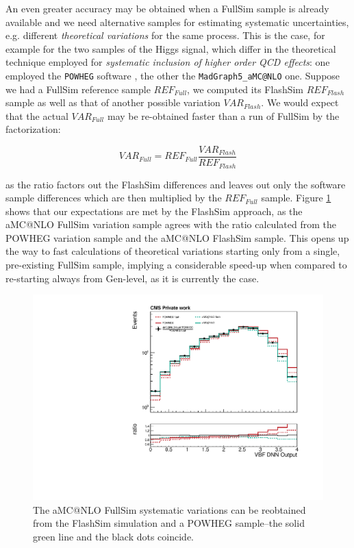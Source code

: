 An even greater accuracy may be obtained when a FullSim sample is already available and we need alternative samples for estimating systematic uncertainties, e.g.  different \emph{theoretical variations} for the same process. This is the case, for example for the two samples of the Higgs signal, which differ in the theoretical technique employed for \emph{systematic inclusion of higher order QCD effects}: one employed the \texttt{POWHEG} software \cite{Nason_2004}, the other the \texttt{MadGraph5\_aMC@NLO} \cite{powpow} one. Suppose we had a FullSim reference sample $REF_{Full}$, we computed its FlashSim $REF_{Flash}$ sample as well as that of another possible variation $VAR_{Flash}$. We would expect that the actual $VAR_{Full}$ may be re-obtained faster than a run of FullSim by the factorization:

\[VAR_{Full} = REF_{Full} \frac{VAR_{Flash}}{REF_{Flash}}
\]

as the ratio factors out the FlashSim differences and leaves out only the software sample differences which are then multiplied by the $REF_{Full}$ sample. Figure \ref{fig:sysvar} shows that our expectations are met by the FlashSim approach, as the aMC@NLO FullSim variation sample agrees with the ratio calculated from the POWHEG variation sample and the aMC@NLO FlashSim sample. This opens up the way to fast calculations of theoretical variations starting only from a single, pre-existing FullSim sample, implying a considerable speed-up when compared to re-starting always from Gen-level, as it is currently the case.

\begin{figure}
    \centering
    \includegraphics[width=\linewidth]{gfx/ch6/systematic_production.pdf}
    \caption[Systematic production]{The aMC@NLO FullSim systematic variations can be reobtained from the FlashSim simulation and a POWHEG sample--the solid green line and the black dots coincide.}
    \label{fig:sysvar}
\end{figure}

